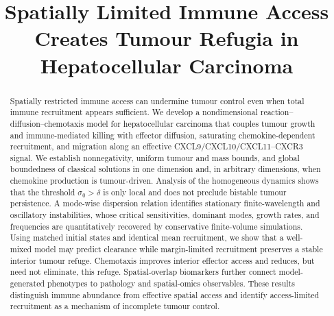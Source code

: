 \documentclass[]{interact}
\theoremstyle{plain}%
\theoremstyle{definition}
\theoremstyle{remark}
\begin{document}

\title{Spatially Limited Immune Access Creates Tumour Refugia in Hepatocellular Carcinoma}

\author{
}

\maketitle

\begin{abstract}
Spatially restricted immune access can undermine tumour control even when total immune recruitment appears sufficient. We develop a nondimensional reaction--diffusion--chemotaxis model for hepatocellular carcinoma that couples tumour growth and immune-mediated killing with effector diffusion, saturating chemokine-dependent recruitment, and migration along an effective CXCL9/CXCL10/CXCL11--CXCR3 signal. We establish nonnegativity, uniform tumour and mass bounds, and global boundedness of classical solutions in one dimension and, in arbitrary dimensions, when chemokine production is tumour-driven. Analysis of the homogeneous dynamics shows that the threshold $\sigma_0>\delta$ is only local and does not preclude bistable tumour persistence. A mode-wise dispersion relation identifies stationary finite-wavelength and oscillatory instabilities, whose critical sensitivities, dominant modes, growth rates, and frequencies are quantitatively recovered by conservative finite-volume simulations. Using matched initial states and identical mean recruitment, we show that a well-mixed model may predict clearance while margin-limited recruitment preserves a stable interior tumour refuge. Chemotaxis improves interior effector access and reduces, but need not eliminate, this refuge. Spatial-overlap biomarkers further connect model-generated phenotypes to pathology and spatial-omics observables. These results distinguish immune abundance from effective spatial access and identify access-limited recruitment as a mechanism of incomplete tumour control.
\end{abstract}
\end{document}
